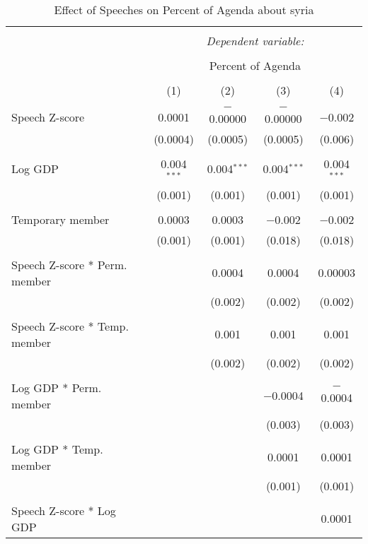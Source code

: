 
\begin{table}[!htbp] \centering 
  \caption{Effect of Speeches on Percent of Agenda about syria} 
  \label{} 
\begin{tabular}{@{\extracolsep{5pt}}lcccc} 
\\[-1.8ex]\hline 
\hline \\[-1.8ex] 
 & \multicolumn{4}{c}{\textit{Dependent variable:}} \\ 
\cline{2-5} 
\\[-1.8ex] & \multicolumn{4}{c}{Percent of Agenda} \\ 
\\[-1.8ex] & (1) & (2) & (3) & (4)\\ 
\hline \\[-1.8ex] 
 Speech Z-score & 0.0001 & $-$0.00000 & $-$0.00000 & $-$0.002 \\ 
  & (0.0004) & (0.0005) & (0.0005) & (0.006) \\ 
  & & & & \\ 
 Log GDP & 0.004$^{***}$ & 0.004$^{***}$ & 0.004$^{***}$ & 0.004$^{***}$ \\ 
  & (0.001) & (0.001) & (0.001) & (0.001) \\ 
  & & & & \\ 
 Temporary member & 0.0003 & 0.0003 & $-$0.002 & $-$0.002 \\ 
  & (0.001) & (0.001) & (0.018) & (0.018) \\ 
  & & & & \\ 
 Speech Z-score * Perm. member &  & 0.0004 & 0.0004 & 0.00003 \\ 
  &  & (0.002) & (0.002) & (0.002) \\ 
  & & & & \\ 
 Speech Z-score * Temp. member &  & 0.001 & 0.001 & 0.001 \\ 
  &  & (0.002) & (0.002) & (0.002) \\ 
  & & & & \\ 
 Log GDP * Perm. member &  &  & $-$0.0004 & $-$0.0004 \\ 
  &  &  & (0.003) & (0.003) \\ 
  & & & & \\ 
 Log GDP * Temp. member &  &  & 0.0001 & 0.0001 \\ 
  &  &  & (0.001) & (0.001) \\ 
  & & & & \\ 
 Speech Z-score * Log GDP &  &  &  & 0.0001 \\ 

\end{tabular}
\end{table}
